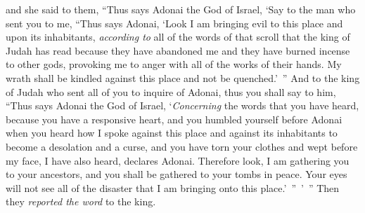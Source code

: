 \begin{biblechapter}
\verse and she said to them, “Thus says Adonai the God of Israel, ‘Say to the man who sent you to me,
\verse “Thus says Adonai, ‘Look I am bringing evil to this place and upon its inhabitants, \textit{according to} all of the words of that scroll that the king of Judah has read
\verse because they have abandoned me and they have burned incense to other gods, provoking me to anger with all of the works of their hands. My wrath shall be kindled against this place and not be quenched.’ ”
\verse And to the king of Judah who sent all of you to inquire of Adonai, thus you shall say to him, “Thus says Adonai the God of Israel, ‘\textit{Concerning} the words that you have heard,
\verse because you have a responsive heart, and you humbled yourself before Adonai when you heard how I spoke against this place and against its inhabitants to become a desolation and a curse, and you have torn your clothes and wept before my face, I have also heard, declares Adonai.
\verse Therefore look, I am gathering you to your ancestors, and you shall be gathered to your tombs in peace. Your eyes will not see all of the disaster that I am bringing onto this place.’ ” ’ ” Then they \textit{reported the word} to the king.
\end{biblechapter}

